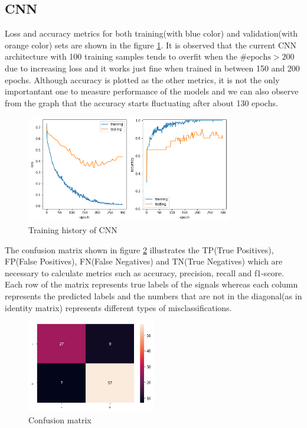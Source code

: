 \documentclass[a4paper]{article}
\begin{document}
\subsection{CNN}
Loss and accuracy metrics for both training(with blue color) and validation(with orange color) sets are shown in the figure \ref{fig:cnn_plot}. It is observed that the current CNN architecture with 100 
training samples tends to overfit when the $\#\text{epochs} > 200$ due to increasing loss and it works just fine when trained in between 150 and 200 epochs. Although accuracy is plotted as the other metrics, 
it is not the only importantant one to measure performance of the models and we can also observe from the graph that the accuracy starts fluctuating after about 130 epochs.

\begin{figure}[h]
	\centering
	\includegraphics[width=0.8\textwidth]{img/cnn_result.png}
	\caption{Training history of CNN}
	\label{fig:cnn_plot}
\end{figure}

The confusion matrix shown in figure \ref{fig:cnn_prfs} illustrates the TP(True Positives), FP(False Positives), FN(False Negatives) and TN(True Negatives) which are necessary to calculate metrics such as 
accuracy, precision, recall and f1-score. Each row of the matrix represents true labels of the signals whereas each column represents the predicted labels and the numbers that are not in the diagonal(as in 
identity matrix) represents different types of misclassifications.

\begin{figure}[h]
	\centering
	\includegraphics[width=0.5\textwidth]{img/cnn_prfs.png}
	\caption{Confusion matrix}
	\label{fig:cnn_prfs}
\end{figure}
\end{document}
